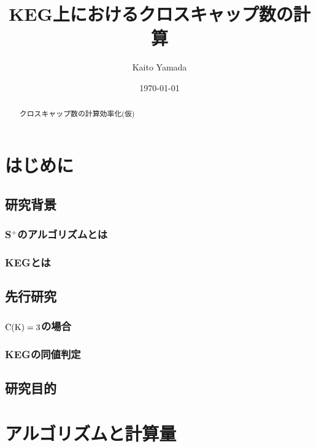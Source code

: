 \documentclass[11pt,a4j]{jarticle}
\title{KEG上におけるクロスキャップ数の計算}
\author{Kaito Yamada}
\date{\today}
\newcommand{\splus}{S${}^\text{+}$}
\newcommand{\fl}[1]{$\rm{#1}$}
\begin{document}
\maketitle
\vspace{30mm}
\begin{abstract}
    クロスキャップ数の計算効率化(仮)
\end{abstract}

\clearpage

\tableofcontents

\pagestyle{plain}
\lhead{\rightmark}

\section{はじめに} %

\subsection{研究背景}
\subsubsection{\splus のアルゴリズムとは}
\subsubsection{KEGとは}


\subsection{先行研究}
\subsubsection{\fl{C(K)=3}の場合}
\subsubsection{KEGの同値判定}

\subsection{研究目的}

\section{アルゴリズムと計算量}
\end{document}
